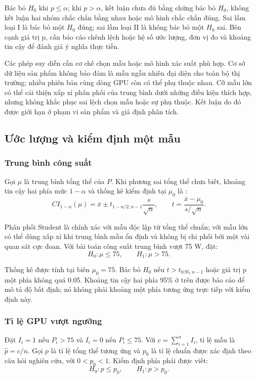 Bác bỏ \(H_0\) khi \(p\leq\alpha\); khi \(p>\alpha\), kết luận chưa đủ bằng chứng bác bỏ \(H_0\), không kết luận hai nhóm chắc chắn bằng nhau hoặc mô hình chắc chắn đúng. Sai lầm loại I là bác bỏ một \(H_0\) đúng; sai lầm loại II là không bác bỏ một \(H_0\) sai. Bên cạnh giá trị p, cần báo cáo chênh lệch hoặc hệ số ước lượng, đơn vị đo và khoảng tin cậy để đánh giá ý nghĩa thực tiễn.

Các phép suy diễn cần cơ chế chọn mẫu hoặc mô hình xác suất phù hợp. Cơ sở dữ liệu sản phẩm không bảo đảm là mẫu ngẫu nhiên đại diện cho toàn bộ thị trường; nhiều phiên bản cùng dòng GPU còn có thể phụ thuộc nhau. Cỡ mẫu lớn có thể cải thiện xấp xỉ phân phối của trung bình dưới những điều kiện thích hợp, nhưng không khắc phục sai lệch chọn mẫu hoặc sự phụ thuộc. Kết luận do đó được giới hạn ở phạm vi sản phẩm và giả định phân tích.

\subsection{Ước lượng và kiểm định một mẫu}

\subsubsection{Trung bình công suất}

Gọi \(\mu\) là trung bình tổng thể của \(P\). Khi phương sai tổng thể chưa biết, khoảng tin cậy hai phía mức \(1-\alpha\) và thống kê kiểm định tại \(\mu_0\) là \cite{ref2}:
\nopagebreak[4]
\[
CI_{1-\alpha}(\mu)=\bar{x}\pm t_{1-\alpha/2,n-1}\frac{s}{\sqrt{n}},
\qquad t=\frac{\bar{x}-\mu_0}{s/\sqrt{n}}.
\]

Phân phối Student là chính xác với mẫu độc lập từ tổng thể chuẩn; với mẫu lớn có thể dùng xấp xỉ khi trung bình mẫu ổn định và không bị chi phối bởi một vài quan sát cực đoan. Với bài toán công suất trung bình vượt 75 W, đặt:
\nopagebreak[4]
\[H_0:\mu\leq75,\qquad H_1:\mu>75.\]

Thống kê được tính tại biên \(\mu_0=75\). Bác bỏ \(H_0\) nếu \(t>t_{0.95,n-1}\) hoặc giá trị p một phía không quá 0.05. Khoảng tin cậy hai phía 95\% ở trên được báo cáo để mô tả độ bất định; nó không phải khoảng một phía tương ứng trực tiếp với kiểm định này.

\subsubsection{Tỉ lệ GPU vượt ngưỡng}

Đặt \(I_i=1\) nếu \(P_i>75\) và \(I_i=0\) nếu \(P_i\leq75\). Với \(c=\sum_{i=1}^{n}I_i\), tỉ lệ mẫu là \(\hat p=c/n\). Gọi \(p\) là tỉ lệ tổng thể tương ứng và \(p_0\) là tỉ lệ chuẩn được xác định theo câu hỏi nghiên cứu, với \(0<p_0<1\). Kiểm định phía phải được viết:
\nopagebreak[4]
\[H_0:p\leq p_0,\qquad H_1:p>p_0.\]

